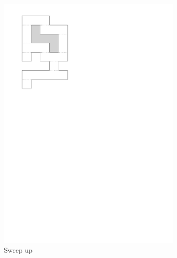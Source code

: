 \documentclass[english,gradu]{tktltiki2018}
\begin{document}
\begin{figure}
\begin{subfigure}[t]{0.15\textwidth}
		\includegraphics[width=\textwidth,page=3]{fig/light2d}
		\caption{Sweep up}\label{fig:light2d:up}
	\end{subfigure}
	\hfil
	\begin{subfigure}[t]{0.15\textwidth}\centering

\end{subfigure}
\end{figure}
\end{document}
